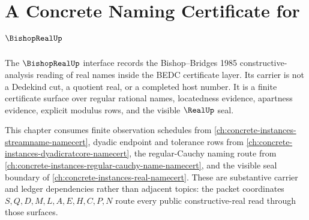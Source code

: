 \chapter{A Concrete Naming Certificate for $\BishopRealUp$}
\label{ch:concrete-instances-bishopreal-namecert}

The $\BishopRealUp$ interface records the Bishop--Bridges 1985 constructive-analysis
reading of real names inside the BEDC certificate layer. Its carrier is not a
Dedekind cut, a quotient real, or a completed host number. It is a finite
certificate surface over regular rational names, locatedness evidence,
apartness evidence, explicit modulus rows, and the visible $\RealUp$ seal.

This chapter consumes finite observation schedules from
\autoref{ch:concrete-instances-streamname-namecert}, dyadic endpoint and
tolerance rows from
\autoref{ch:concrete-instances-dyadicratcore-namecert}, the regular-Cauchy
naming route from
\autoref{ch:concrete-instances-regular-cauchy-name-namecert}, and the visible seal
boundary of \autoref{ch:concrete-instances-real-namecert}. These are substantive
carrier and ledger dependencies rather than adjacent topics: the packet
coordinates $S,Q,D,M,L,A,E,H,C,P,N$ route every public constructive-real read
through those surfaces.

